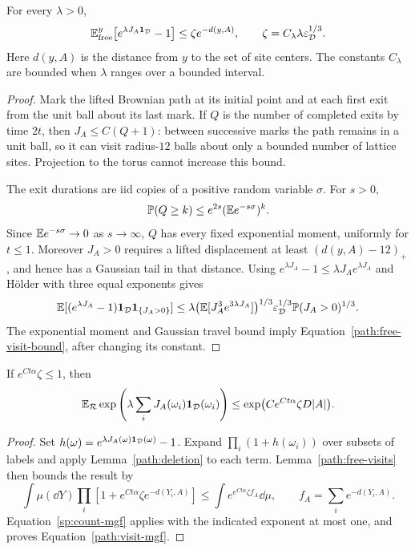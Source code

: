 \begin{lemma}\label{path:free-visits}
For every $\lambda>0$,
\begin{equation}\label{path:free-visit-bound}
 \mathbb E^y_{\rm free}\bigl[e^{\lambda J_A\mathbf 1_{\mathcal D}}-1\bigr]
 \le \zeta e^{-d(y,A)},\qquad
 \zeta=C_\lambda\lambda\varepsilon_{\mathcal D}^{1/3}.
\end{equation}
Here $d(y,A)$ is the distance from $y$ to the set of site centers.
The constants $C_\lambda$ are bounded when $\lambda$ ranges over a
bounded interval.
\end{lemma}

\begin{proof}
Mark the lifted Brownian path at its initial point and at each first
exit from the unit ball about its last mark.  If $Q$ is the number
of completed exits by time $2t$, then $J_A\le C(Q+1)$: between
successive marks the path remains in a unit ball, so it can visit
radius-$12$ balls about only a bounded number of lattice sites.
Projection to the torus cannot increase this bound.

The exit durations are iid copies of a positive random variable
$\sigma$.  For $s>0$,
\[
 \mathbb P(Q\ge k)\le e^{2s}(\mathbb E e^{-s\sigma})^k.
\]
Since $\mathbb E e^{-s\sigma}\to0$ as $s\to\infty$, $Q$ has every fixed
exponential moment, uniformly for $t\le1$.  Moreover $J_A>0$
requires a lifted displacement at least $(d(y,A)-12)_+$, and hence
has a Gaussian tail in that distance.  Using
$e^{\lambda J_A}-1\le\lambda J_A e^{\lambda J_A}$ and H\"older
with three equal exponents gives
\[
 \mathbb E[(e^{\lambda J_A}-1)\mathbf 1_{\mathcal D}\mathbf 1_{\{J_A>0\}}]
 \le \lambda\bigl(\mathbb E[J_A^3e^{3\lambda J_A}]\bigr)^{1/3}
       \varepsilon_{\mathcal D}^{1/3}
       \mathbb P(J_A>0)^{1/3}.
\]
The exponential moment and Gaussian travel bound imply
Equation~\eqref{path:free-visit-bound}, after changing its constant.
\end{proof}

\begin{lemma}\label{path:visit-moments}
If $e^{Ct\alpha}\zeta\le1$, then
\begin{equation}\label{path:visit-mgf}
 \mathbb E_{\mathcal R}\exp\left(\lambda\sum_i
             J_A(\omega_i)\mathbf 1_{\mathcal D}(\omega_i)\right)
 \le \exp\bigl(Ce^{Ct\alpha}\zeta D|A|\bigr).
\end{equation}
\end{lemma}

\begin{proof}
Set $h(\omega)=e^{\lambda J_A(\omega)\mathbf 1_{\mathcal D}(\omega)}-1$.
Expand $\prod_i(1+h(\omega_i))$ over subsets of labels and apply
Lemma~\ref{path:deletion} to each term.  Lemma~\ref{path:free-visits}
then bounds the result by
\[
 \int\mu(\dd Y)\prod_i
      [1+e^{Ct\alpha}\zeta e^{-d(Y_i,A)}]
 \le \int e^{e^{Ct\alpha}\zeta f_A}\dd\mu,
 \qquad f_A=\sum_i e^{-d(Y_i,A)}.
\]
Equation~\eqref{sp:count-mgf} applies with the indicated exponent
at most one, and proves Equation~\eqref{path:visit-mgf}.
\end{proof}

